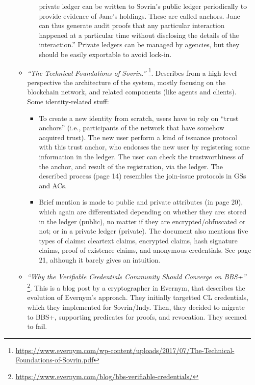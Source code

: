 \begin{itemize}
\begin{itemize}
\begin{itemize}
{        private ledger can be written to Sovrin's public ledger periodically to
        provide evidence of Jane's holdings. These are called anchors. Jane can
        thus generate audit proofs that any particular interaction happened at a
        particular time without disclosing the details of the interaction.''}
      Private ledgers can be managed by agencies, but they should be easily
      exportable to avoid lock-in.
    \end{itemize}
  \item \emph{``The Technical Foundations of Sovrin.''}%
    \footnote{\url{https://www.evernym.com/wp-content/uploads/2017/07/The-Technical-Foundations-of-Sovrin.pdf}}.
    Describes from a high-level perspective the architecture of the system,
    mostly focusing on the blockchain network, and related components (like
    agents and clients). Some identity-related stuff:
    \begin{itemize}
    \item To create a new identity from scratch, users have to rely on ``trust
      anchors'' (i.e., participants of the network that have somehow acquired
      trust). The new user perform a kind of issuance protocol with this trust
      anchor, who endorses the new user by registering some information in the
      ledger. The user can check the trustworthiness of the anchor, and result
      of the registration, via the ledger. The described process (page 14)
      resembles the join-issue protocols in GSs and ACs.      
    \item Brief mention is made to public and private attributes (in page 20),
      which again are differentiated depending on whether they are: stored in
      the ledger (public), no matter if they are encrypted/obfuscated or not;
      or in a private ledger (private). %
      The document also mentions five types of claims: cleartext claims,
      encrypted claims, hash signature claims, proof of existence claims, and
      anonymous credentials. See page 21, although it barely gives an
      intuition.      
    \end{itemize}
  \item \emph{``Why the Verifiable Credentials Community Should Converge on BBS+''}%
    \footnote{\url{https://www.evernym.com/blog/bbs-verifiable-credentials/}}.
    This is a blog post by a cryptographer in Evernym, that describes the
    evolution of Evernym's approach. They initially targetted CL credentials,
    which they implemented for Sovrin/Indy. Then, they decided to migrate to
    BBS+, supporting predicates for proofs, and revocation. They seemed to fail.

\end{itemize}
\end{itemize}
